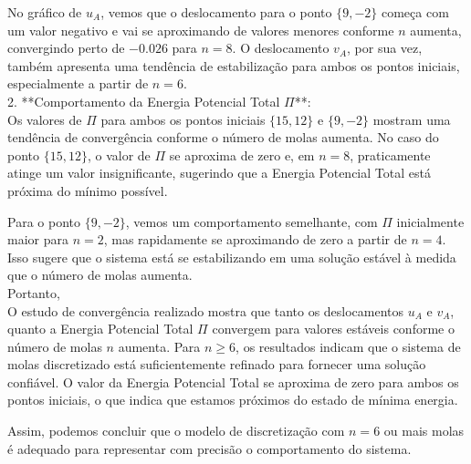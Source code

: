 \documentclass[a4paper, 12pt]{article}
\begin{document}
No gráfico de \( u_A \), vemos que o deslocamento para o ponto \( \{9, -2\} \) começa com um valor negativo e vai se aproximando de valores menores conforme \( n \) aumenta, convergindo perto de \( -0.026 \) para \( n = 8 \). O deslocamento \( v_A \), por sua vez, também apresenta uma tendência de estabilização para ambos os pontos iniciais, especialmente a partir de \( n = 6 \).\\

2. **Comportamento da Energia Potencial Total \( \Pi \)**:\\

Os valores de \( \Pi \) para ambos os pontos iniciais \( \{15, 12\} \) e \( \{9, -2\} \) mostram uma tendência de convergência conforme o número de molas aumenta. No caso do ponto \( \{15, 12\} \), o valor de \( \Pi \) se aproxima de zero e, em \( n = 8 \), praticamente atinge um valor insignificante, sugerindo que a Energia Potencial Total está próxima do mínimo possível.

Para o ponto \( \{9, -2\} \), vemos um comportamento semelhante, com \( \Pi \) inicialmente maior para \( n = 2 \), mas rapidamente se aproximando de zero a partir de \( n = 4 \). Isso sugere que o sistema está se estabilizando em uma solução estável à medida que o número de molas aumenta.\\

Portanto,\\

O estudo de convergência realizado mostra que tanto os deslocamentos \( u_A \) e \( v_A \), quanto a Energia Potencial Total \( \Pi \) convergem para valores estáveis conforme o número de molas \( n \) aumenta. Para \( n \geq 6 \), os resultados indicam que o sistema de molas discretizado está suficientemente refinado para fornecer uma solução confiável. O valor da Energia Potencial Total se aproxima de zero para ambos os pontos iniciais, o que indica que estamos próximos do estado de mínima energia.

Assim, podemos concluir que o modelo de discretização com \( n = 6 \) ou mais molas é adequado para representar com precisão o comportamento do sistema.

\newpage









\newpage
    \nocite{*}
    
    
\end{document}
